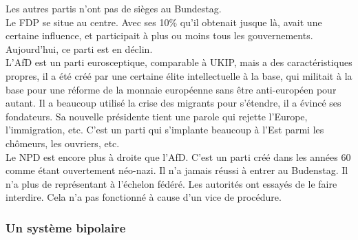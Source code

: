 \documentclass[10pt, a4paper, openany]{book}
\begin{document}
Les autres partis n'ont pas de sièges au Bundestag. \\
Le FDP se situe au centre. Avec ses 10\% qu'il obtenait jusque là, avait une certaine influence, et participait à plus ou moins tous les gouvernements. Aujourd'hui, ce parti est en déclin. \\
L'AfD est un parti eurosceptique, comparable à UKIP, mais a des caractéristiques propres, il a été créé par une certaine élite intellectuelle à la base, qui militait à la base pour une réforme de la monnaie européenne sans être anti-européen pour autant. Il a beaucoup utilisé la crise des migrants pour s'étendre, il a évincé ses fondateurs. Sa nouvelle présidente tient une parole qui rejette l'Europe, l'immigration, etc. C'est un parti qui s'implante beaucoup à l'Est parmi les chômeurs, les ouvriers, etc. \\
Le NPD est encore plus à droite que l'AfD. C'est un parti créé dans les années 60 comme étant ouvertement néo-nazi. Il n'a jamais réussi à entrer au Budenstag. Il n'a plus de représentant à l'échelon fédéré. Les autorités ont essayés de le faire interdire. Cela n'a pas fonctionné à cause d'un vice de procédure. 

\subsubsection{Un système bipolaire}
\end{document}
